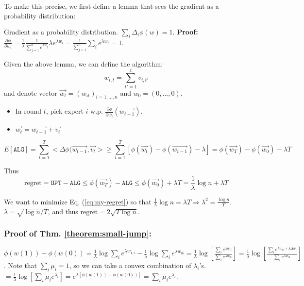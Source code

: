 To make this precise, we first define a lemma that sees the gradient as a probability distribution:
\begin{lemma}{Gradient as a probability distribution.}
  $\sum_{i} \Delta_{i} \phi(w) = 1$. \textbf{Proof:} $\frac{\partial \phi}{\partial w_{i}} = \frac{1}{\lambda} \frac{1}{\sum_{j=1}^{n} e^{\lambda w_{j}}} \lambda e^{\lambda w_{i}} = \frac{1}{\sum_{j=1}^{n} } \sum_{i} e^{\lambda w_{i}} = 1$.
\end{lemma}

Given the above lemma, we can define the algorithm:
\begin{equation*}
  w_{i,t} = \sum_{t'=1}^{t} v_{i,t'}
\end{equation*}
and denote vector
$\vec{w_{t}} = (w_{it})_{i=1,...,n}$ and $w_{0} = (0,...,0)$.
\begin{itemize}
\item In round $t$, pick expert $i$ w.p. $\frac{\partial \phi}{\partial w_{i}} (\vec{w_{t-1}})$.
\item $\vec{w_{t}} = \vec{w_{t-1}} + \vec{v_{t}}$
\end{itemize}
\begin{equation}
  \label{eq:exp-alg}
  E[\mathtt{ALG}] = \sum_{t=1}^{T} < \Delta \phi(\vec{w_{t-1}}, \vec{v_{t}}> \geq \sum_{t=1}^{T}[ \phi(\vec{w_{t}}) - \phi(\vec{w_{t-1}}) - \lambda] = \phi(\vec{w_{T}}) - \phi(\vec{w_{0}}) - \lambda T
\end{equation}

Thus
\begin{equation}
  \label{eq:my-regret}
  \mbox{regret} = \mathtt{OPT} - \mathtt{ALG} \leq \phi(\vec{w_{T}}) - \mathtt{ALG} \leq \phi(\vec{w_{0}}) + \lambda T = \frac{1}{\lambda} \log n + \lambda T
\end{equation}

We want to minimize Eq. (\ref{eq:my-regret}) so that $\frac{1}{\lambda} \log n  = \lambda T \Rightarrow \lambda^{2} = \frac{\log n}{T}$.
$\lambda = \sqrt{\log n/T}$, and thus $\mbox{regret} = 2 \sqrt{T \log n}$.


\subsubsection{Proof of Thm. \ref{theorem:small-jump}: }
$\phi(w(1)) - \phi(w(0)) = \frac{1}{\lambda} \log \sum_{i} e^{\lambda w_{1,i}} - \frac{1}{\lambda} \log \sum_{i} e^{\lambda w_{0i}} = \frac{1}{\lambda} \log \left[ \frac{\sum_{i} e^{\lambda w_{1i}}}{\sum_{i}e^{\lambda w_{0i}}} \right]  =\frac{1}{\lambda} \log \left[ \frac{\sum_{i} e^{\lambda w_{1i} + \lambda \Delta w_{i}}}{\sum_{i}e^{\lambda w_{0i}}} \right]$. Note that $\sum_{i} \mu_{i} = 1$, so we can take a convex combination of $\lambda_{i}$'s.
$=\frac{1}{\lambda} \log [ \sum_{i} \mu_{i} e^{\lambda_{i}}] = e^{\lambda[\phi(w(1)) - \phi(w(0))]} = \sum_{i} \mu_{i} e^{\lambda_{i}}$.

